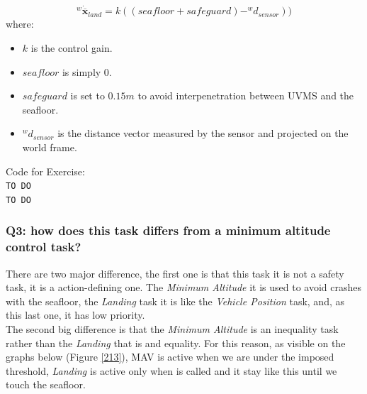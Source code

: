 \documentclass{article}
\begin{document}
\begin{equation}
    ^{w}\dot{\overline{\boldsymbol{x}}}_{land} = k((seafloor + safeguard) - ^w d_{sensor})) %
\end{equation}
where:
\begin{itemize}
    \item $k$ is the control gain.
    \item $seafloor$ is simply 0.
    \item $safeguard$ is set to $0.15m$  to avoid interpenetration between UVMS and the seafloor.
    \item $^w d_{sensor}$ is the distance vector measured by the sensor and projected on the world frame.
\end{itemize} 

\colorbox{mygray}{\parbox{0.9\textwidth}{Code for Exercise: \\
\texttt{TO DO}\\
\texttt{TO DO}
}}

\subsubsection{Q3: how does this task differs from a minimum altitude control task?}
There are two major difference, the first one is that this task it is not a safety task, it is a action-defining one. The \textit{Minimum Altitude} it is used to avoid crashes with the seafloor, the \textit{Landing} task it is like the \textit{Vehicle Position} task, and, as this last one, it has low priority.\\
The second big difference is that the \textit{Minimum Altitude} is an inequality task rather than the \textit{Landing} that is and equality. For this reason, as visible on the graphs below (Figure \ref{213}), MAV is active when we are under the imposed threshold, \textit{Landing} is active only when is called and it stay like this until we touch the seafloor.
\end{document}
